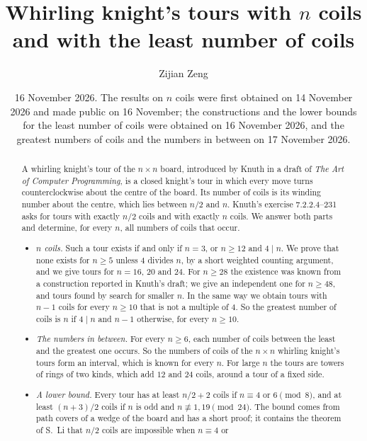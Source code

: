 \documentclass[11pt]{amsart}
\theoremstyle{remark}
\begin{document}
\title[Whirling knight's tours with many and with few coils]{Whirling knight's tours with $n$ coils\\ and with the least number of coils}
\author{Zijian Zeng}
\address{UCSI University, Kuala Lumpur, Malaysia}
\date{16 November 2026. The results on $n$ coils were first obtained on 14 November 2026 and made public on
16 November; the constructions and the lower bounds for the least number of coils were obtained on 16 November
2026, and the greatest numbers of coils and the numbers in between on 17 November 2026.}

\begin{abstract}
A whirling knight's tour of the $n\times n$ board, introduced by Knuth in a draft of \emph{The Art of Computer
Programming}, is a closed knight's tour in which every move turns counterclockwise about the centre of the board. Its
number of coils is its winding number about the centre, which lies between $n/2$ and $n$. Knuth's exercise
7.2.2.4--231 asks for tours with exactly $n/2$ coils and with exactly $n$ coils. We answer both parts and
determine, for every $n$, all numbers of coils that occur.
\begin{itemize}
\item \emph{$n$ coils.} Such a tour exists if and only if $n=3$, or $n\ge12$ and $4\mid n$. We prove that none
exists for $n\ge5$ unless $4$ divides $n$, by a short weighted counting argument, and we give tours for $n=16$, $20$
and $24$. For $n\ge28$ the existence was known from a construction reported in Knuth's draft; we give an
independent one for $n\ge48$, and tours found by search for smaller $n$. In the same way we obtain tours with $n-1$
coils for every $n\ge10$ that is not a multiple of $4$. So the
greatest number of coils is $n$ if $4\mid n$ and $n-1$ otherwise, for every $n\ge10$.
\item \emph{The numbers in between.} For every $n\ge6$, each number of coils between the least and the greatest one
occurs. So the numbers of coils of the $n\times n$ whirling knight's tours form an interval, which is known for
every $n$. For large $n$ the tours are towers of rings of two kinds, which add $12$ and $24$
coils, around a tour of a fixed side.
\item \emph{A lower bound.} Every tour has at least $n/2+2$ coils if $n\equiv4$ or $6\pmod 8$, and at least
$(n+3)/2$ coils if $n$ is odd and $n\not\equiv1,19\pmod{24}$. The bound comes from path covers of a wedge of the
board and has a short proof; it contains the theorem of S.~Li that $n/2$ coils are impossible when $n\equiv4$ or

\end{itemize}
\end{abstract}
\end{document}
